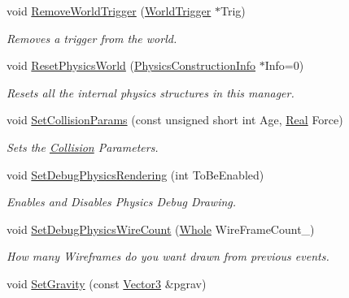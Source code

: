 \begin{DoxyCompactItemize}
void \hyperlink{classMezzanine_1_1PhysicsManager_ab3d96f132ab95690c520348f986140b8}{RemoveWorldTrigger} (\hyperlink{classMezzanine_1_1WorldTrigger}{WorldTrigger} $\ast$Trig)
\begin{DoxyCompactList}\small\item\em Removes a trigger from the world. \item\end{DoxyCompactList}\item 
void \hyperlink{classMezzanine_1_1PhysicsManager_aa4333ad1d8382ead2401e2870603ae89}{ResetPhysicsWorld} (\hyperlink{classMezzanine_1_1PhysicsConstructionInfo}{PhysicsConstructionInfo} $\ast$Info=0)
\begin{DoxyCompactList}\small\item\em Resets all the internal physics structures in this manager. \item\end{DoxyCompactList}\item 
void \hyperlink{classMezzanine_1_1PhysicsManager_acda375c8effd99c6bb01f2aeb0e55741}{SetCollisionParams} (const unsigned short int Age, \hyperlink{namespaceMezzanine_a726731b1a7df72bf3583e4a97282c6f6}{Real} Force)
\begin{DoxyCompactList}\small\item\em Sets the \hyperlink{classMezzanine_1_1Collision}{Collision} Parameters. \item\end{DoxyCompactList}\item 
void \hyperlink{classMezzanine_1_1PhysicsManager_ac1104ad21c6c779bb93147163d066f7e}{SetDebugPhysicsRendering} (int ToBeEnabled)
\begin{DoxyCompactList}\small\item\em Enables and Disables Physics Debug Drawing. \item\end{DoxyCompactList}\item 
void \hyperlink{classMezzanine_1_1PhysicsManager_a7a2fd072c1035b744ce4c22265219d8b}{SetDebugPhysicsWireCount} (\hyperlink{namespaceMezzanine_adcbb6ce6d1eb4379d109e51171e2e493}{Whole} WireFrameCount\_\-)
\begin{DoxyCompactList}\small\item\em How many Wireframes do you want drawn from previous events. \item\end{DoxyCompactList}\item 
void \hyperlink{classMezzanine_1_1PhysicsManager_a565b338b5930571713ff72de45c95485}{SetGravity} (const \hyperlink{classMezzanine_1_1Vector3}{Vector3} \&pgrav)

\end{DoxyCompactItemize}

